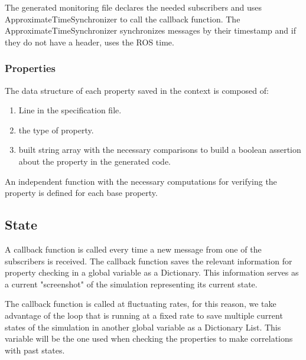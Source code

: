 The generated monitoring file declares the needed subscribers and uses ApproximateTimeSynchronizer to call the callback function. The ApproximateTimeSynchronizer synchronizes messages by their timestamp and if they do not have a header, uses the ROS time.


\subsubsection{Properties}
\label{sssec:compileProp}


The data structure of each property saved in the context is composed of:

\begin{enumerate}
    \item Line in the specification file.
    \item the type of property.
    \item built string array with the necessary comparisons to build a boolean assertion about the property in the generated code.
\end{enumerate}

An independent function with the necessary computations for verifying the property is defined for each base property.


\subsection{State}
\label{ssec:compileState}

A callback function is called every time a new message from one of the subscribers is received. The callback function saves the relevant information for property checking in a global variable as a Dictionary. This information serves as a current "screenshot" of the simulation representing its current state.

The callback function is called at fluctuating rates, for this reason, we take advantage of the loop that is running at a fixed rate to save multiple current states of the simulation in another global variable as a Dictionary List. This variable will be the one used when checking the properties to make correlations with past states.



